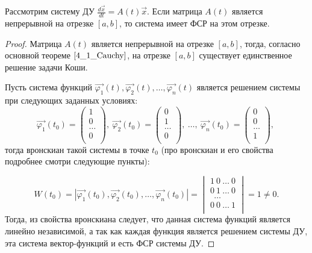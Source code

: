\begin{theorem}
    Рассмотрим систему ДУ $\frac{d \overrightarrow x}{dt} = A(t) \overrightarrow x$. Если матрица $A(t)$ является непрерывной на отрезке $[a, b]$, то система
    имеет ФСР на этом отрезке.
\end{theorem}
\begin{proof}
    Матрица $A(t)$ является непрерывной на отрезке $[a, b]$, тогда, согласно основной теореме $\eqref{4_1_Cauchy}$, на отрезке $[a, b]$ существует единственное решение задачи Коши.
    
    Пусть система функций $\overrightarrow{\varphi_1}(t), \overrightarrow{\varphi_2}(t), \dots, \overrightarrow{\varphi_n}(t)$ является решением системы при следующих заданных условиях:
    \begin{equation}
        \overrightarrow{\varphi_1}(t_0) = 
        \begin{pmatrix}
            1 \\
            0 \\
            \dots \\
            0 \\
        \end{pmatrix}, ~
        \overrightarrow{\varphi_2}(t_0) = 
        \begin{pmatrix}
        0 \\
        1 \\
        \dots \\
        0 \\
        \end{pmatrix}, ~
        \dots, ~
        \overrightarrow{\varphi_n}(t_0) = 
        \begin{pmatrix}
        0 \\
        0 \\
        \dots \\
        1 \\
        \end{pmatrix}, ~
    \end{equation}
    тогда вронскиан такой системы в точке $t_0$ (про вронскиан и его свойства подробнее смотри следующие пункты):
    
    \begin{equation}
    W(t_0) = |\overrightarrow{\varphi_1}(t_0), \overrightarrow{\varphi_2}(t_0), \dots, \overrightarrow{\varphi_n}(t_0)| =
    \begin{vmatrix}
        1 ~ 0 ~ \dots ~ 0 \\
        0 ~ 1 ~ \dots ~ 0 \\
            ~~  \dots     \\
        0 ~ 0 ~ \dots ~ 1 \\
    \end{vmatrix} = 1 \neq 0.
    \end{equation}
    Тогда, из свойства вронскиана следует, что данная система функций является линейно независимой, а так как каждая функция является решением системы ДУ, эта система вектор-функций и есть ФСР системы ДУ.
\end{proof}

